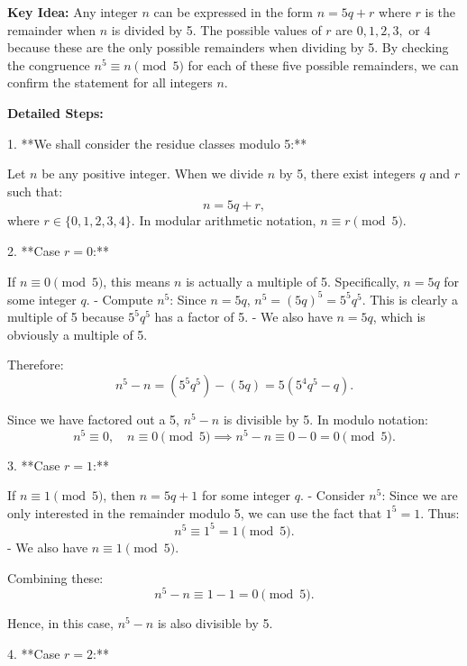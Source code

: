 \documentclass[12pt,a4paper]{article}
\begin{document}
\noindent\textbf{Key Idea:}  
Any integer $n$ can be expressed in the form $n=5q+r$ where $r$ is the remainder when $n$ is divided by 5. The possible values of $r$ are $0,1,2,3,$ or $4$ because these are the only possible remainders when dividing by 5. By checking the congruence $n^5 \equiv n \pmod{5}$ for each of these five possible remainders, we can confirm the statement for all integers $n$.

\medskip

\noindent\textbf{Detailed Steps:}

1. **We shall consider the residue classes modulo 5:**

   Let $n$ be any positive integer. When we divide $n$ by 5, there exist integers $q$ and $r$ such that:
   \[
   n = 5q + r,
   \]
   where $r \in \{0,1,2,3,4\}$. In modular arithmetic notation, $n \equiv r \pmod{5}$.

\medskip

2. **Case $r=0$:**
\medskip
   
   If $n \equiv 0 \pmod{5}$, this means $n$ is actually a multiple of 5. Specifically, $n=5q$ for some integer $q$.
   - Compute $n^5$: Since $n=5q$, $n^5=(5q)^5 = 5^5q^5$. This is clearly a multiple of 5 because $5^5q^5$ has a factor of 5.
   - We also have $n=5q$, which is obviously a multiple of 5.
   
\medskip

   Therefore:
   \[
   n^5 - n = (5^5q^5) - (5q) = 5(5^4q^5 - q).
   \]
   
   Since we have factored out a 5, $n^5-n$ is divisible by 5. In modulo notation:
   \[
   n^5 \equiv 0, \quad n \equiv 0 \pmod{5} \implies n^5-n \equiv 0-0=0 \pmod{5}.
   \]

3. **Case $r=1$:**

\medskip
   
   If $n \equiv 1 \pmod{5}$, then $n=5q+1$ for some integer $q$.
   - Consider $n^5$: Since we are only interested in the remainder modulo 5, we can use the fact that $1^5=1$. Thus:
     \[
     n^5 \equiv 1^5 = 1 \pmod{5}.
     \]
   - We also have $n \equiv 1 \pmod{5}$.
   
\medskip

   Combining these:
   \[
   n^5 - n \equiv 1 - 1 = 0 \pmod{5}.
   \]

   Hence, in this case, $n^5-n$ is also divisible by 5.

   \bigskip

4. **Case $r=2$:**

\medskip
   
\end{document}
